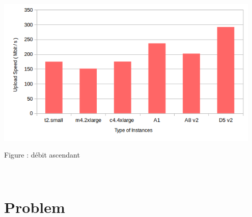\documentclass[11pt]{article}
\begin{document}
~\\
\centerline{\includegraphics[width=0.95\textwidth]{images/upload.png}} %
\centerline{Figure : débit ascendant} 
~\\

\pagebreak
\section{Problem}
\end{document}
